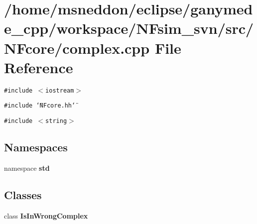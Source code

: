 \section{/home/msneddon/eclipse/ganymede\_\-cpp/workspace/NFsim\_\-svn/src/NFcore/complex.cpp File Reference}
\label{complex_8cpp}


{\tt \#include $<$iostream$>$}\par
{\tt \#include \char`\"{}NFcore.hh\char`\"{}}\par
{\tt \#include $<$string$>$}\par
\subsection*{Namespaces}
\begin{CompactItemize}
\item 
namespace {\bf std}
\end{CompactItemize}
\subsection*{Classes}
\begin{CompactItemize}
\item 
class {\bf IsInWrongComplex}
\end{CompactItemize}
